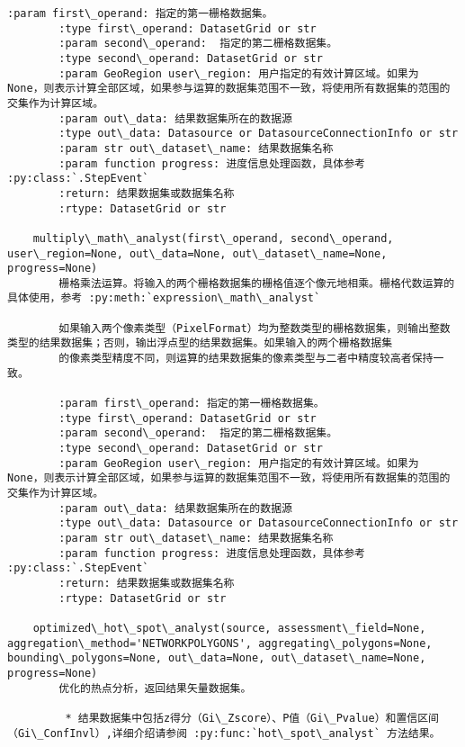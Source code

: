 \documentclass[11pt]{article}
\begin{document}
\begin{Verbatim}[commandchars=\\\{\}]
        :param first\_operand: 指定的第一栅格数据集。
        :type first\_operand: DatasetGrid or str
        :param second\_operand:  指定的第二栅格数据集。
        :type second\_operand: DatasetGrid or str
        :param GeoRegion user\_region: 用户指定的有效计算区域。如果为 None，则表示计算全部区域，如果参与运算的数据集范围不一致，将使用所有数据集的范围的交集作为计算区域。
        :param out\_data: 结果数据集所在的数据源
        :type out\_data: Datasource or DatasourceConnectionInfo or str
        :param str out\_dataset\_name: 结果数据集名称
        :param function progress: 进度信息处理函数，具体参考 :py:class:`.StepEvent`
        :return: 结果数据集或数据集名称
        :rtype: DatasetGrid or str
    
    multiply\_math\_analyst(first\_operand, second\_operand, user\_region=None, out\_data=None, out\_dataset\_name=None, progress=None)
        栅格乘法运算。将输入的两个栅格数据集的栅格值逐个像元地相乘。栅格代数运算的具体使用，参考 :py:meth:`expression\_math\_analyst`
        
        如果输入两个像素类型（PixelFormat）均为整数类型的栅格数据集，则输出整数类型的结果数据集；否则，输出浮点型的结果数据集。如果输入的两个栅格数据集
        的像素类型精度不同，则运算的结果数据集的像素类型与二者中精度较高者保持一致。
        
        :param first\_operand: 指定的第一栅格数据集。
        :type first\_operand: DatasetGrid or str
        :param second\_operand:  指定的第二栅格数据集。
        :type second\_operand: DatasetGrid or str
        :param GeoRegion user\_region: 用户指定的有效计算区域。如果为 None，则表示计算全部区域，如果参与运算的数据集范围不一致，将使用所有数据集的范围的交集作为计算区域。
        :param out\_data: 结果数据集所在的数据源
        :type out\_data: Datasource or DatasourceConnectionInfo or str
        :param str out\_dataset\_name: 结果数据集名称
        :param function progress: 进度信息处理函数，具体参考 :py:class:`.StepEvent`
        :return: 结果数据集或数据集名称
        :rtype: DatasetGrid or str
    
    optimized\_hot\_spot\_analyst(source, assessment\_field=None, aggregation\_method='NETWORKPOLYGONS', aggregating\_polygons=None, bounding\_polygons=None, out\_data=None, out\_dataset\_name=None, progress=None)
        优化的热点分析，返回结果矢量数据集。
        
         * 结果数据集中包括z得分（Gi\_Zscore）、P值（Gi\_Pvalue）和置信区间（Gi\_ConfInvl）,详细介绍请参阅 :py:func:`hot\_spot\_analyst` 方法结果。
        

\end{Verbatim}
\end{document}
